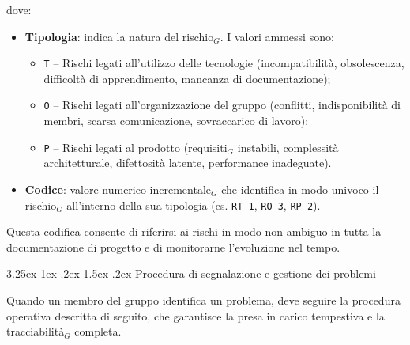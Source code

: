 \documentclass[a4paper, 10pt]{article}
\makeatletter
\renewcommand\paragraph{\@startsection{paragraph}{4}{\z@}%
  {3.25ex \@plus1ex \@minus .2ex}%
  {1.5ex \@plus .2ex}%
  {\normalfont\normalsize\bfseries}}
\makeatother
\begin{document}
dove:
\begin{itemize}
    \item \textbf{Tipologia}: indica la natura del rischio$_G$. I valori ammessi sono:
    \begin{itemize}
        \item \texttt{T} – Rischi legati all'utilizzo delle tecnologie (incompatibilità, obsolescenza, difficoltà di apprendimento, mancanza di documentazione);
        \item \texttt{O} – Rischi legati all'organizzazione del gruppo (conflitti, indisponibilità di membri, scarsa comunicazione, sovraccarico di lavoro);
        \item \texttt{P} – Rischi legati al prodotto (requisiti$_G$ instabili, complessità architetturale, difettosità latente, performance inadeguate).
    \end{itemize}
    \item \textbf{Codice}: valore numerico incrementale$_G$ che identifica in modo univoco il rischio$_G$ all'interno della sua tipologia (es. \texttt{RT-1}, \texttt{RO-3}, \texttt{RP-2}).
\end{itemize}

Questa codifica consente di riferirsi ai rischi in modo non ambiguo in tutta la documentazione di progetto e di monitorarne l'evoluzione nel tempo.

\paragraph{Procedura di segnalazione e gestione dei problemi}

Quando un membro del gruppo identifica un problema, deve seguire la procedura operativa descritta di seguito, che garantisce la presa in carico tempestiva e la tracciabilità$_G$ completa.
\end{document}
